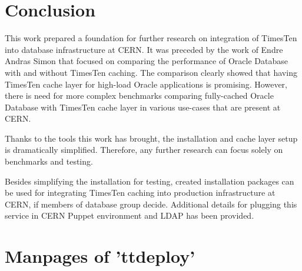 \documentclass[11pt, letterpaper]{article}
\begin{document}

\section{Conclusion}

This work prepared a foundation for further research on integration of TimesTen into database infrastructure at CERN. It was preceded by the work of Endre Andras Simon that focused on comparing the performance of Oracle Database with and without TimesTen caching\cite{endre}. The comparison clearly showed that having TimesTen cache layer for high-load Oracle applications is promising. However, there is need for more complex benchmarks comparing fully-cached Oracle Database with TimesTen cache layer in various use-cases that are present at CERN.

Thanks to the tools this work has brought, the installation and cache layer setup is dramatically simplified. Therefore, any further research can focus solely on benchmarks and testing.

Besides simplifying the installation for testing, created installation packages can be used for integrating TimesTen caching into production infrastructure at CERN, if members of database group decide. Additional details for plugging this service in CERN Puppet environment and LDAP has been provided.

\newpage


\appendix

\printglossaries
\glsaddall

\section{Manpages of 'ttdeploy'}
\end{document}
